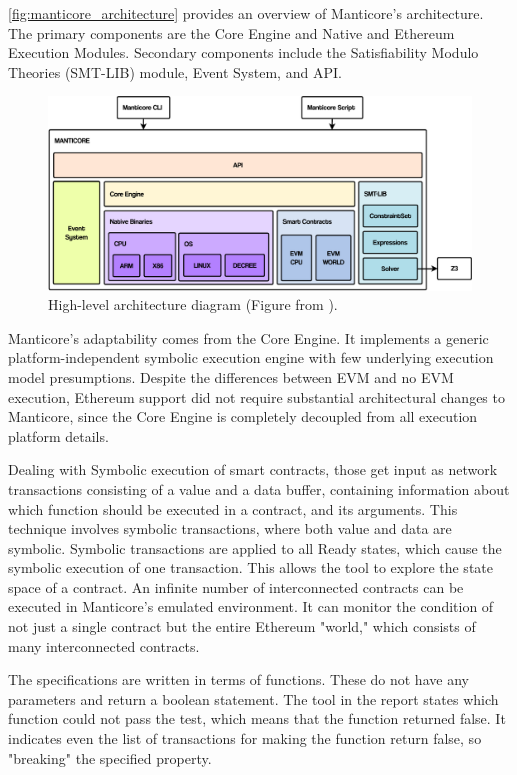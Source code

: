\autoref{fig:manticore_architecture} provides an overview of Manticore's architecture. The primary
components are the Core Engine and Native and Ethereum
Execution Modules. Secondary components include the Satisfiability Modulo Theories (SMT-LIB) module, Event System,
and API.
\begin{figure}
    \centering
    \includegraphics[width=13cm]{logos/ManticoreArchitecture.pdf}
    \caption{High-level architecture diagram (Figure from \cite{ManticorePaper}).}
    \label{fig:manticore_architecture}
\end{figure}

Manticore's adaptability comes from the Core Engine.
It implements a generic platform-independent symbolic execution engine with few underlying execution model presumptions. 
Despite the differences between  EVM and no EVM execution,
Ethereum support did not require substantial architectural
changes to Manticore, since the Core Engine is completely
decoupled from all execution platform details.

Dealing with Symbolic execution of smart contracts, those get input as network transactions consisting of a value and a data buffer, 
containing information about which function should be executed in a contract, and its
arguments.
This technique involves symbolic transactions, where both value and data are symbolic. Symbolic transactions are applied to all Ready states, which
cause the symbolic execution of one transaction. This allows the tool to explore the state space of a contract.
An infinite number of interconnected contracts can be executed in Manticore's emulated environment.
It can monitor the condition of not just a single contract but the entire Ethereum "world," which consists of many interconnected contracts. 

The specifications are written in terms of functions. These do not have any parameters and return a boolean statement. 
The tool in the report states which function could not pass the test, which means that the function returned false. 
It indicates even the list of transactions for making the function return false, so "breaking" the specified property.


